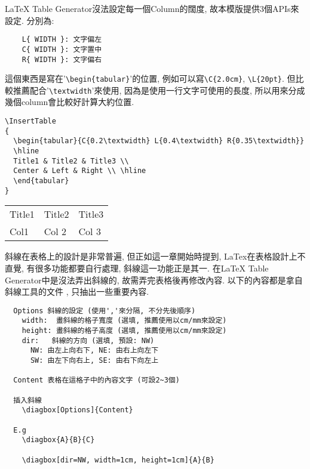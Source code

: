 \newpage
{}

LaTeX Table Generator沒法設定每一個Column的闊度, 故本模版提供3個APIs來設定. 分別為:
  \begin{verbatim}
    L{ WIDTH }: 文字偏左
    C{ WIDTH }: 文字置中
    R{ WIDTH }: 文字偏右
  \end{verbatim}
這個東西是寫在'\verb|\begin{tabular}|'的位置, 例如可以寫\verb|\C{2.0cm}|, \verb|\L{20pt}|. 但比較推薦配合'\verb|\textwidth|'來使用, 因為是使用一行文字可使用的長度, 所以用來分成幾個column會比較好計算大約位置.

\begin{verbatim}
\InsertTable
{
  \begin{tabular}{C{0.2\textwidth} L{0.4\textwidth} R{0.35\textwidth}}
  \hline
  Title1 & Title2 & Title3 \\
  Center & Left & Right \\ \hline
  \end{tabular}
}
\end{verbatim}

    \InsertTable
      {
        \begin{tabular}{C{0.2\textwidth} L{0.4\textwidth} R{0.35\textwidth}}
        \hline
        Title1 & Title2 & Title3 \\
        Col1 & Col 2 & Col 3 \\ \hline
        \end{tabular}
      }

\newpage
{}

斜線在表格上的設計是非常普遍, 但正如這一章開始時提到, LaTex在表格設計上不直覺, 有很多功能都要自行處理, 斜線這一功能正是其一. 在LaTeX Table Generator中是沒法弄出斜線的, 故需弄完表格後再修改內容. 以下的內容都是拿自斜線工具的文件 , 只抽出一些重要內容.

  \EmptyLine
  \begin{fmpage}{\textwidth}
  \begin{verbatim}
  Options 斜線的設定 (使用','來分隔, 不分先後順序)
    width:  畫斜線的格子寬度 (選填, 推薦使用以cm/mm來設定)
    height: 畫斜線的格子高度 (選填, 推薦使用以cm/mm來設定)
    dir:   斜線的方向 (選填, 預設: NW)
      NW: 由左上向右下, NE: 由右上向左下
      SW: 由左下向右上, SE: 由右下向左上

  Content 表格在這格子中的內容文字 (可設2~3個)

  插入斜線
    \diagbox[Options]{Content}

  E.g
    \diagbox{A}{B}{C}

    \diagbox[dir=NW, width=1cm, height=1cm]{A}{B}
  \end{verbatim}
  \end{fmpage}
  \EmptyLine

